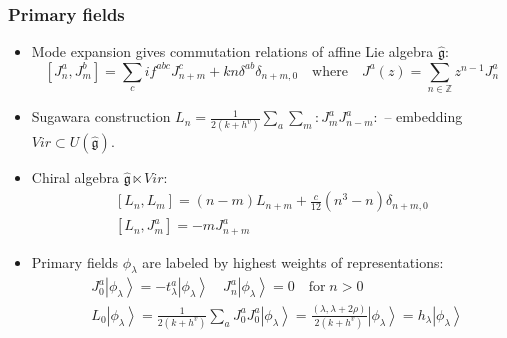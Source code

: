 \documentclass[pdftex]{beamer}
\newcommand{\gfh}{\hat{\mathfrak{g}}}
\theoremstyle{definition} \newtheorem{Def}{Definition}
\begin{document}
\begin{frame}
  \frametitle{Primary fields}
  \begin{itemize}
  \item Mode expansion gives commutation relations of affine Lie algebra $\gfh$: 
    \begin{equation*}
      \left[J^a_n,J^b_m\right]=\sum_c i f^{abc}J^c_{n+m}+kn\delta^{ab}\delta_{n+m,0} \quad \text{where} \quad           J^a(z)=\sum\limits_{n\in \mathbb Z}z^{n-1}J^a_n 
    \end{equation*}
  \item Sugawara construction $  L_n=\frac{1}{2(k+h^v)}\sum\limits_a\sum\limits_m:J^a_m J^a_{n-m}:$ -- embedding $Vir\subset U(\gfh)$.
  \item Chiral algebra $\gfh \ltimes Vir$:
    \begin{equation}
      \label{eq:92}
      \begin{aligned}
        \left[L_n,L_m\right]=(n-m)L_{n+m}+\frac{c}{12}(n^3-n)\delta_{n+m,0}\\
        \left[L_n,J^a_m\right]=-mJ^a_{n+m}
      \end{aligned}
    \end{equation}

  \item Primary fields $\phi_{\lambda}$ are labeled by highest weights of representations:
    \begin{equation*}
      \begin{aligned}
        & J_0^a\left|\phi_{\lambda}\right>=-t^a_{\lambda}\left|\phi_{\lambda}\right>  \quad    J^a_n\left|\phi_{\lambda}\right>=0 \quad \mbox{for}\; n>0 \\
        & L_0\left|\phi_{\lambda}\right>=\frac{1}{2(k+h^v)}\sum_aJ^a_0J^a_0\left|\phi_{\lambda}\right>=\frac{(\lambda,\lambda+2\rho)}{2(k+h^v)}\left|\phi_{\lambda}\right>=h_{\lambda} \left|\phi_{\lambda}\right>
      \end{aligned}
    \end{equation*}
  \end{itemize}
\end{frame}
\end{document}
